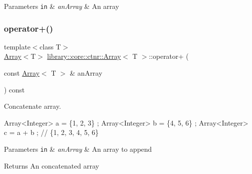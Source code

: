 \begin{DoxyParams}[1]{Parameters}
\mbox{\tt in}  & {\em an\+Array} & An array \\
\hline
\end{DoxyParams}
\mbox{\label{classlibrary_1_1core_1_1ctnr_1_1_array_a5d65732e2a07b268d9def2da3c955002}} 
\subsubsection{\texorpdfstring{operator+()}{operator+()}}
{\footnotesize\ttfamily template$<$class T$>$ \\
\hyperlink{classlibrary_1_1core_1_1ctnr_1_1_array}{Array}$<$T$>$ \hyperlink{classlibrary_1_1core_1_1ctnr_1_1_array}{library\+::core\+::ctnr\+::\+Array}$<$ T $>$\+::operator+ (\begin{DoxyParamCaption}\item[{const \hyperlink{classlibrary_1_1core_1_1ctnr_1_1_array}{Array}$<$ T $>$ \&}]{an\+Array }\end{DoxyParamCaption}) const}



Concatenate array. 


\begin{DoxyCode}
Array<Integer> a = \{1, 2, 3\} ;
Array<Integer> b = \{4, 5, 6\} ;
Array<Integer> c = a + b ; \textcolor{comment}{// \{1, 2, 3, 4, 5, 6\}}
\end{DoxyCode}



\begin{DoxyParams}[1]{Parameters}
\mbox{\tt in}  & {\em an\+Array} & An array to append \\
\hline
\end{DoxyParams}
\begin{DoxyReturn}{Returns}
An concatenated array 
\end{DoxyReturn}
\mbox{\label{classlibrary_1_1core_1_1ctnr_1_1_array_a30a1be66cd95f9e37c965065f95d2b39}} 
